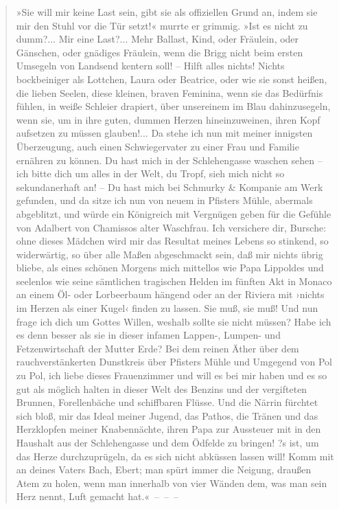 \begin{verse}
»Sie will mir keine Last sein, gibt sie als offiziellen Grund an,
indem sie mir den Stuhl vor die Tür setzt!« murrte er grimmig. »Ist
es nicht zu dumm?... Mir eine Last?... Mehr Ballast, Kind, oder
Fräulein, oder Gänschen, oder gnädiges Fräulein, wenn die Brigg
nicht beim ersten Umsegeln von Landsend kentern soll! – Hilft alles
nichts! Nichts bockbeiniger als Lottchen, Laura oder Beatrice, oder
wie sie sonst heißen, die lieben Seelen, diese kleinen, braven
Feminina, wenn sie das Bedürfnis fühlen, in weiße Schleier
drapiert, über unsereinem im Blau dahinzusegeln, wenn sie, um in
ihre guten, dummen Herzen hineinzuweinen, ihren Kopf aufsetzen zu
müssen glauben!... Da stehe ich nun mit meiner innigsten
Überzeugung, auch einen Schwiegervater zu einer Frau und Familie
ernähren zu können. Du hast mich in der Schlehengasse waschen sehen
– ich bitte dich um alles in der Welt, du Tropf, sieh mich nicht so
sekundanerhaft an! – Du hast mich bei Schmurky \& Kompanie am Werk
gefunden, und da sitze ich nun von neuem in Pfisters Mühle,
abermals abgeblitzt, und würde ein Königreich mit Vergnügen geben
für die Gefühle von Adalbert von Chamissos alter Waschfrau. Ich
versichere dir, Bursche: ohne dieses Mädchen wird mir das Resultat
meines Lebens so stinkend, so widerwärtig, so über alle Maßen
abgeschmackt sein, daß mir nichts übrig bliebe, als eines schönen
Morgens mich mittellos wie Papa Lippoldes und seelenlos wie seine
sämtlichen tragischen Helden im fünften Akt in Monaco an einem Öl-
oder Lorbeerbaum hängend oder an der Riviera mit ›nichts im Herzen
als einer Kugel‹ finden zu lassen. Sie muß, sie muß! Und nun frage
ich dich um Gottes Willen, weshalb sollte sie nicht müssen? Habe
ich es denn besser als sie in dieser infamen Lappen-, Lumpen- und
Fetzenwirtschaft der Mutter Erde? Bei dem reinen Äther über dem
rauchverstänkerten Dunstkreis über Pfisters Mühle und Umgegend von
Pol zu Pol, ich liebe dieses Frauenzimmer und will es bei mir haben
und es so gut als möglich halten in dieser Welt des Benzins und der
vergifteten Brunnen, Forellenbäche und schiffbaren Flüsse. Und die
Närrin fürchtet sich bloß, mir das Ideal meiner Jugend, das Pathos,
die Tränen und das Herzklopfen meiner Knabennächte, ihren Papa zur
Aussteuer mit in den Haushalt aus der Schlehengasse und dem Ödfelde
zu bringen! ?s ist, um das Herze durchzuprügeln, da es sich nicht
abküssen lassen will! Komm mit an deines Vaters Bach, Ebert; man
spürt immer die Neigung, draußen Atem zu holen, wenn man innerhalb
von vier Wänden dem, was man sein Herz nennt, Luft gemacht
hat.«~–~–~–


\end{verse}
